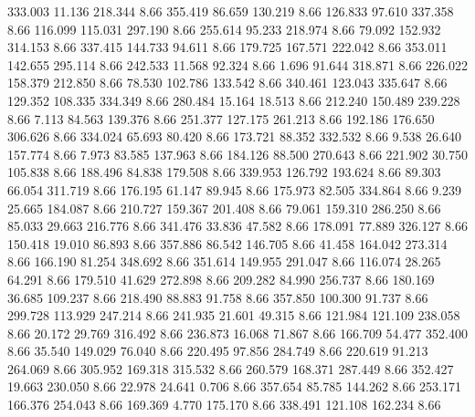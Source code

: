  333.003   11.136  218.344         8.66
 355.419   86.659  130.219         8.66
 126.833   97.610  337.358         8.66
 116.099  115.031  297.190         8.66
 255.614   95.233  218.974         8.66
  79.092  152.932  314.153         8.66
 337.415  144.733   94.611         8.66
 179.725  167.571  222.042         8.66
 353.011  142.655  295.114         8.66
 242.533   11.568   92.324         8.66
   1.696   91.644  318.871         8.66
 226.022  158.379  212.850         8.66
  78.530  102.786  133.542         8.66
 340.461  123.043  335.647         8.66
 129.352  108.335  334.349         8.66
 280.484   15.164   18.513         8.66
 212.240  150.489  239.228         8.66
   7.113   84.563  139.376         8.66
 251.377  127.175  261.213         8.66
 192.186  176.650  306.626         8.66
 334.024   65.693   80.420         8.66
 173.721   88.352  332.532         8.66
   9.538   26.640  157.774         8.66
   7.973   83.585  137.963         8.66
 184.126   88.500  270.643         8.66
 221.902   30.750  105.838         8.66
 188.496   84.838  179.508         8.66
 339.953  126.792  193.624         8.66
  89.303   66.054  311.719         8.66
 176.195   61.147   89.945         8.66
 175.973   82.505  334.864         8.66
   9.239   25.665  184.087         8.66
 210.727  159.367  201.408         8.66
  79.061  159.310  286.250         8.66
  85.033   29.663  216.776         8.66
 341.476   33.836   47.582         8.66
 178.091   77.889  326.127         8.66
 150.418   19.010   86.893         8.66
 357.886   86.542  146.705         8.66
  41.458  164.042  273.314         8.66
 166.190   81.254  348.692         8.66
 351.614  149.955  291.047         8.66
 116.074   28.265   64.291         8.66
 179.510   41.629  272.898         8.66
 209.282   84.990  256.737         8.66
 180.169   36.685  109.237         8.66
 218.490   88.883   91.758         8.66
 357.850  100.300   91.737         8.66
 299.728  113.929  247.214         8.66
 241.935   21.601   49.315         8.66
 121.984  121.109  238.058         8.66
  20.172   29.769  316.492         8.66
 236.873   16.068   71.867         8.66
 166.709   54.477  352.400         8.66
  35.540  149.029   76.040         8.66
 220.495   97.856  284.749         8.66
 220.619   91.213  264.069         8.66
 305.952  169.318  315.532         8.66
 260.579  168.371  287.449         8.66
 352.427   19.663  230.050         8.66
  22.978   24.641    0.706         8.66
 357.654   85.785  144.262         8.66
 253.171  166.376  254.043         8.66
 169.369    4.770  175.170         8.66
 338.491  121.108  162.234         8.66
